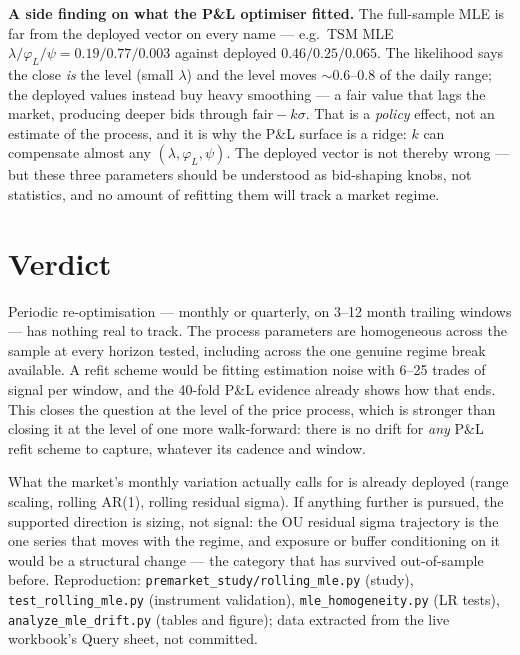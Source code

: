 \documentclass[11pt,a4paper]{article}
\begin{document}
\textbf{A side finding on what the P\&L optimiser fitted.} The full-sample MLE is far
from the deployed vector on every name --- e.g.\ TSM MLE
$\lambda/\varphi_L/\psi = 0.19/0.77/0.003$ against deployed $0.46/0.25/0.065$. The
likelihood says the close \emph{is} the level (small $\lambda$) and the level moves
$\sim\!0.6$--$0.8$ of the daily range; the deployed values instead buy heavy smoothing
--- a fair value that lags the market, producing deeper bids through $\mathrm{fair} -
k\sigma$. That is a \emph{policy} effect, not an estimate of the process, and it is
why the P\&L surface is a ridge: $k$ can compensate almost any $(\lambda, \varphi_L,
\psi)$. The deployed vector is not thereby wrong --- but these three parameters should
be understood as bid-shaping knobs, not statistics, and no amount of refitting them
will track a market regime.

\section*{Verdict}

Periodic re-optimisation --- monthly or quarterly, on 3--12 month trailing windows ---
has nothing real to track. The process parameters are homogeneous across the sample at
every horizon tested, including across the one genuine regime break available. A refit
scheme would be fitting estimation noise with 6--25 trades of signal per window, and
the 40-fold P\&L evidence already shows how that ends. This closes the question at the
level of the price process, which is stronger than closing it at the level of one more
walk-forward: there is no drift for \emph{any} P\&L refit scheme to capture, whatever
its cadence and window.

What the market's monthly variation actually calls for is already deployed (range
scaling, rolling AR(1), rolling residual sigma). If anything further is pursued, the
supported direction is sizing, not signal: the OU residual sigma trajectory is the
one series that moves with the regime, and exposure or buffer conditioning on it would
be a structural change --- the category that has survived out-of-sample before.
Reproduction: \texttt{premarket\_study/rolling\_mle.py} (study),
\texttt{test\_rolling\_mle.py} (instrument validation),
\texttt{mle\_homogeneity.py} (LR tests), \texttt{analyze\_mle\_drift.py} (tables and
figure); data extracted from the live workbook's Query sheet, not committed.
\end{document}
